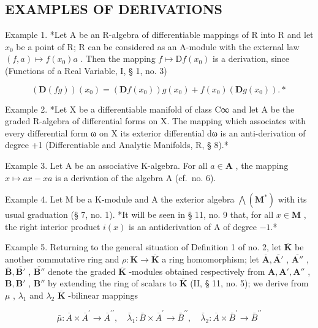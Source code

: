 \subsection{EXAMPLES OF DERIVATIONS}

Example 1. *Let A be an R-algebra of differentiable mappings of R into R and let \(x_0\) be a point of R; R can be considered as an A-module with the external law \((f, a) \mapsto f(x_0)a\) . Then the mapping \(f \mapsto \mathrm{D}f(x_0)\) is a derivation, since (Functions of a Real Variable, I, § 1, no. 3)

\[
(\mathbf {D} (f g)) (x _ {0}) = (\mathbf {D} f (x _ {0})) g (x _ {0}) + f (x _ {0}) (\mathbf {D} g (x _ {0})). *
\]

Example 2. *Let X be a differentiable manifold of class C∞ and let A be the graded R-algebra of differential forms on X. The mapping which associates with every differential form ω on X its exterior differential dω is an anti-derivation of degree +1 (Differentiable and Analytic Manifolds, R, § 8).*

Example 3. Let A be an associative K-algebra. For all \(a \in \mathbf{A}\) , the mapping \(x \mapsto ax - xa\) is a derivation of the algebra A (cf.~no. 6).

Example 4. Let M be a K-module and A the exterior algebra \(\bigwedge (\mathbf{M}^{*})\) with its usual graduation (§ 7, no. 1). *It will be seen in § 11, no. 9 that, for all \(x\in \mathbf{M}\) , the right interior product \(i(x)\) is an antiderivation of A of degree \(-1\).*

Example 5. Returning to the general situation of Definition 1 of no. 2, let \(\overline{\mathbf{K}}\) be another commutative ring and \(\rho: \mathbf{K} \to \overline{\mathbf{K}}\) a ring homomorphism; let \(\overline{\mathbf{A}}, \overline{\mathbf{A}'}\) , \(\overline{\mathbf{A}''}\) , \(\overline{\mathbf{B}}, \overline{\mathbf{B}'}\) , \(\overline{\mathbf{B}''}\) denote the graded \(\overline{\mathbf{K}}\) -modules obtained respectively from \(\mathbf{A}, \mathbf{A}', \mathbf{A}''\) , \(\mathbf{B}, \mathbf{B}'\) , \(\mathbf{B}''\) by extending the ring of scalars to \(\overline{\mathbf{K}}\) (II, § 11, no. 5); we derive from \(\mu\) , \(\lambda_1\) and \(\lambda_2\) \(\overline{\mathbf{K}}\) -bilinear mappings

\[
\bar {\mu}: \overline {{{A}}} \times \overline {{{A}}} ^ {\prime} \rightarrow \overline {{{A}}} ^ {\prime \prime}, \quad \bar {\lambda} _ {1}: \bar {B} \times \overline {{{A}}} ^ {\prime} \rightarrow \bar {B} ^ {\prime \prime}, \quad \bar {\lambda} _ {2}: \overline {{{A}}} \times \bar {B} ^ {\prime} \rightarrow \bar {B} ^ {\prime \prime}
\]

